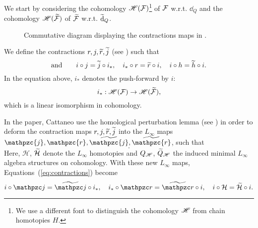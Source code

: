 We start by considering the cohomology $\mathscr{H}(\mathcal{F})$\footnote{We use a different font to distinguish the cohomology $\mathscr{H}$ from chain homotopies $H$.}
of $\mathcal{F}$ w.r.t. $\dd_Q$ and the cohomology $\mathscr{H}(\widetilde{\mathcal{F}})$ of $\widetilde{\mathcal{F}}$ w.r.t. $\widetilde{\dd}_Q$.
\begin{figure}
    \centering
    
    \caption{Commutative diagram displaying the contractions maps in .}
    \label{fig:contractions_diagram}
\end{figure}
We define the contractions $r, j, \widetilde{r}, \widetilde{j}$ (see ) such that
\begin{equation}
\label{eq:4.12}
    
\end{equation}
\begin{equation}
\label{eq:contractions}
    \text{and} \qquad
    i \circ j = \widetilde{j} \circ i_*, \quad
    i_* \circ r = \widetilde{r} \circ i, \quad
    i \circ h = \widetilde{h} \circ i .
\end{equation}
In the equation above, $i_*$ denotes the push-forward by $i$:
\begin{equation*}
    i_* : \mathscr{H}(\mathcal{F}) \rightarrow \mathscr{H}(\widetilde{\mathcal{F}}) ,
\end{equation*}
which is a linear isomorphism in cohomology.

In the paper, Cattaneo \etal use the homological perturbation lemma (see \cite[Section 6.4]{Hom_mirror_trasnfer_lemma}) in order to deform the contraction maps $r, j, \widetilde{r}, \widetilde{j}$ into the $L_\infty$ maps $\mathpzc{j}, \mathpzc{r}, \wt{\mathpzc{j}}, \wt{\mathpzc{r}}$, such that
\begin{equation}
     .
\end{equation}
Here, $\mathcal{H}$, $\widetilde{\mathcal{H}}$ denote the $L_\infty$ homotopies and $Q_{\mathscr{H}}$, $\widetilde{Q}_{\mathscr{H}}$ the induced minimal $L_\infty$ algebra structures on cohomology.
With these new $L_\infty$ maps, Equations~(\ref{eq:contractions}) become
\begin{equation}
    i \circ \cazz{j} = \wt{\cazz{j}} \circ i_*, \quad
    i_* \circ \cazz{r} = \wt{\cazz{r}} \circ i, \quad
    i \circ \mc{H} = \wt{\mc{H}} \circ i .
\end{equation}

